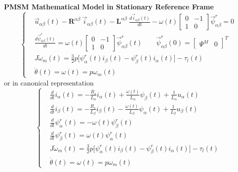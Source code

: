 \documentclass[11pt,a4paper,oneside]{book}
\numberwithin{equation}{section}
\theoremstyle{it}
\theoremstyle{definition}
\begin{document}
\begin{mybox}
	\textbf{PMSM Mathematical Model in Stationary Reference Frame}
	\begin{equation}\label{twophase_model_ref}
		\left\lbrace \begin{aligned}
			& \vec{u}_{\alpha\beta}(t)-\mathbf{R}^{\alpha\beta}\ 
			\vec{i}_{\alpha\beta}(t)-\mathbf{L}^{\alpha\beta}\ 
			\frac{d\vec{i}_{\alpha\beta}(t)}{dt}-\omega(t) \begin{bmatrix} 
				0 & -1 \\ 1 & 0\end{bmatrix} \vec{\psi}^r_{\alpha\beta} = 0 
			\\[6pt]
			& \frac{d\vec{\psi}^r_{\alpha\beta}(t)}{dt} = \omega(t) 
			\begin{bmatrix} 0 & -1 \\ 1 & 0\end{bmatrix} 
			\vec{\psi}^r_{\alpha\beta}(t) \qquad 
			\vec{\psi}^r_{\alpha\beta}(0) = \begin{bmatrix} \Psi^M &  0 
			\end{bmatrix}^T \\[6pt]
			& J\dot{\omega}_m(t) = 
			\frac{3}{2}p\Big[\psi^r_{\alpha}(t)i_{\beta}(t)-\psi^r_{\beta}(t)i_{\alpha}(t)\Big]
			-\tau_l(t) \\[6pt]
			& \dot{\theta}(t) = \omega(t) = p\omega_m(t)
		\end{aligned} \right. 
	\end{equation}
	or in canonical representation
	\begin{equation}\label{twophase_model_ref_ab_splitted}
		\left\lbrace \begin{aligned}
			& \frac{d}{dt} i_\alpha(t)= -\frac{R_s}{L_\alpha}i_\alpha(t) 
			+\frac{\omega(t)}{L_\alpha}\psi_\beta(t)+\frac{1}{L_\alpha}u_\alpha(t)
			 \\[6pt]
			& \frac{d}{dt} i_\beta(t)= -\frac{R_s}{L_\beta}i_\beta(t) 
			-\frac{\omega(t)}{L_\beta}\psi_\alpha(t)+\frac{1}{L_\beta}u_\beta(t)
			 \\[6pt]
			&\frac{d}{dt} \psi_\alpha^r(t) = -\omega(t)\psi_\beta^r(t) \\[6pt]
			&\frac{d}{dt} \psi_\beta^r(t) = \omega(t)\psi_\alpha^r(t) \\[6pt]
			& J\dot{\omega}_m(t) = 
			\frac{3}{2}p\Big[\psi^r_{\alpha}(t)i_{\beta}(t)-\psi^r_{\beta}(t)i_{\alpha}(t)\Big]
			-\tau_l(t) \\[6pt]
			& \dot{\theta}(t) = \omega(t) = p\omega_m(t)
		\end{aligned} \right. 
	\end{equation}

\end{mybox}
\end{document}
